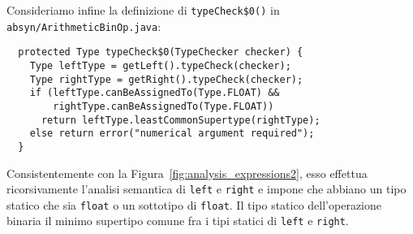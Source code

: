 Consideriamo infine la definizione di \texttt{typeCheck\$0()}
in \texttt{absyn/ArithmeticBinOp.java}:
%
\begin{verbatim}
  protected Type typeCheck$0(TypeChecker checker) {
    Type leftType = getLeft().typeCheck(checker);
    Type rightType = getRight().typeCheck(checker);
    if (leftType.canBeAssignedTo(Type.FLOAT) &&
        rightType.canBeAssignedTo(Type.FLOAT))
      return leftType.leastCommonSupertype(rightType);
    else return error("numerical argument required");
  }
\end{verbatim}
Consistentemente con la Figura~\ref{fig:analysis_expressions2},
esso effettua ricorsivamente l'analisi semantica di
\texttt{left} e \texttt{right} e impone che abbiano un tipo statico
che sia \texttt{float} o un sottotipo di \texttt{float}. Il tipo statico
dell'operazione binaria \e il minimo supertipo comune fra i tipi
statici di \texttt{left} e \texttt{right}.
%
